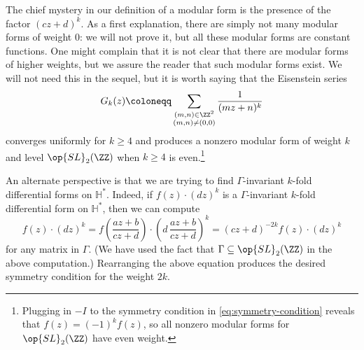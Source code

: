\documentclass{amsart}
\begin{document}
The chief mystery in our definition of a modular form is the presence of the factor $(cz+d)^k$. As a first explanation, there are simply not many modular forms of weight $0$: we will not prove it, but all these modular forms are constant functions. One might complain that it is not clear that there are modular forms of higher weights, but we assure the reader that such modular forms exist. We will not need this in the sequel, but it is worth saying that the Eisenstein series
\[G_k(z)\coloneqq\sum_{\substack{(m,n)\in\ZZ^2\\(m,n)\ne(0,0)}}\frac1{(mz+n)^k}\]
converges uniformly for $k\ge4$ and produces a nonzero modular form of weight $k$ and level $\op{SL}_2(\ZZ)$ when $k\ge4$ is even.\footnote{Plugging in $-I$ to the symmetry condition in \eqref{eq:symmetry-condition} reveals that $f(z)=(-1)^kf(z)$, so all nonzero modular forms for $\op{SL}_2(\ZZ)$ have even weight.}

An alternate perspective is that we are trying to find $\Gamma$-invariant $k$-fold differential forms on $\mathbb H^*$. Indeed, if $f(z)\cdot(dz)^k$ is a $\Gamma$-invariant $k$-fold differential form on $\mathbb H^*$, then we can compute
\[f(z)\cdot(dz)^k=f\left(\frac{az+b}{cz+d}\right)\cdot \left(d\,\frac{az+b}{cz+d}\right)^k=(cz+d)^{-2k}f(z)\cdot(dz)^k\]
for any matrix in $\Gamma$. (We have used the fact that $\Gamma\subseteq\op{SL}_2(\ZZ)$ in the above computation.) Rearranging the above equation produces the desired symmetry condition for the weight $2k$.
\end{document}
